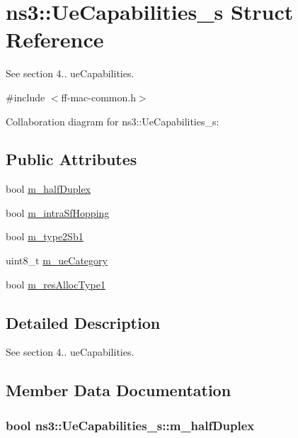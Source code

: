 \hypertarget{structns3_1_1UeCapabilities__s}{}\section{ns3\+:\+:Ue\+Capabilities\+\_\+s Struct Reference}
\label{structns3_1_1UeCapabilities__s}


See section 4.. ue\+Capabilities.  




{\ttfamily \#include $<$ff-\/mac-\/common.\+h$>$}



Collaboration diagram for ns3\+:\+:Ue\+Capabilities\+\_\+s\+:
\subsection*{Public Attributes}
\begin{DoxyCompactItemize}
\item 
bool \hyperlink{structns3_1_1UeCapabilities__s_aa6ada3026a0efa976da17d6f3cc7d509}{m\+\_\+half\+Duplex}
\item 
bool \hyperlink{structns3_1_1UeCapabilities__s_a1472edbb4f5fbbb415dedf557f324617}{m\+\_\+intra\+Sf\+Hopping}
\item 
bool \hyperlink{structns3_1_1UeCapabilities__s_a01d57ac1baec239924ffe55ed94b1f06}{m\+\_\+type2\+Sb1}
\item 
uint8\+\_\+t \hyperlink{structns3_1_1UeCapabilities__s_ac8e2c4367c705bea699a4c4d39acc3fb}{m\+\_\+ue\+Category}
\item 
bool \hyperlink{structns3_1_1UeCapabilities__s_a8e2976f85b05f3dd1959c99e2a173614}{m\+\_\+res\+Alloc\+Type1}
\end{DoxyCompactItemize}


\subsection{Detailed Description}
See section 4.. ue\+Capabilities. 

\subsection{Member Data Documentation}
\subsubsection[{\texorpdfstring{m\+\_\+half\+Duplex}{m_halfDuplex}}]{\setlength{\rightskip}{0pt plus 5cm}bool ns3\+::\+Ue\+Capabilities\+\_\+s\+::m\+\_\+half\+Duplex}\hypertarget{structns3_1_1UeCapabilities__s_aa6ada3026a0efa976da17d6f3cc7d509}{}\label{structns3_1_1UeCapabilities__s_aa6ada3026a0efa976da17d6f3cc7d509}
